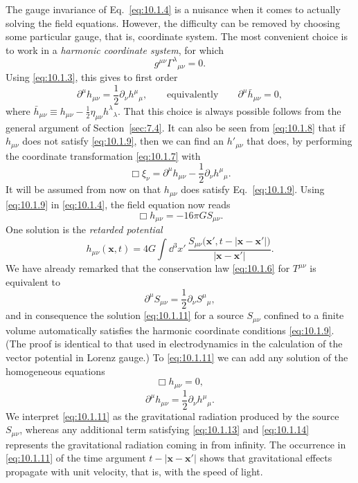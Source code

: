 The gauge invariance of Eq.~\eqref{eq:10.1.4} is a nuisance when it comes to
actually solving the field equations. However, the difficulty can be removed
by choosing some particular gauge, that is, coordinate system. The most
convenient choice is to work in a \emph{harmonic coordinate system}, for which
\[
  g^{\mu\nu}\Gamma^\lambda{}_{\mu\nu}=0.
\]
Using \eqref{eq:10.1.3}, this gives to first order
\begin{equation}
  \partial^\mu h_{\mu\nu}
  =
  \frac12\partial_\nu h^\mu{}_\mu,
  \qquad\text{equivalently}\qquad
  \partial^\mu\bar h_{\mu\nu}=0,
  \tag{10.1.9}\label{eq:10.1.9}
\end{equation}
where
\(\bar h_{\mu\nu}\equiv h_{\mu\nu}
-\frac12\eta_{\mu\nu}h^\lambda{}_\lambda\).
That this choice is always possible follows from the general argument of
Section~\ref{sec:7.4}. It can also be seen from \eqref{eq:10.1.8} that if
\(h_{\mu\nu}\) does not satisfy \eqref{eq:10.1.9}, then we can find an
\(h'_{\mu\nu}\) that does, by performing the coordinate transformation
\eqref{eq:10.1.7} with
\[
  \Box\xi_\nu
  =
  \partial^\mu h_{\mu\nu}
  -\frac12\partial_\nu h^\mu{}_\mu.
\]
It will be assumed from now on that \(h_{\mu\nu}\) does satisfy
Eq.~\eqref{eq:10.1.9}. Using \eqref{eq:10.1.9} in \eqref{eq:10.1.4}, the
field equation now reads
\begin{equation}
  \Box h_{\mu\nu}=-16\pi G S_{\mu\nu}.
  \tag{10.1.10}\label{eq:10.1.10}
\end{equation}
One solution is the \emph{retarded potential}
\begin{equation}
  h_{\mu\nu}(\mathbf{x},t)
  =
  4G\int \dd^3x'\,
  \frac{S_{\mu\nu}\bigl(\mathbf{x}',t-\lvert\mathbf{x}-\mathbf{x}'\rvert\bigr)}
       {\lvert\mathbf{x}-\mathbf{x}'\rvert}.
  \tag{10.1.11}\label{eq:10.1.11}
\end{equation}
We have already remarked that the conservation law
\eqref{eq:10.1.6} for \(T^{\mu\nu}\) is equivalent to
\begin{equation}
  \partial^\mu S_{\mu\nu}
  =
  \frac12\partial_\nu S^\mu{}_\mu,
  \tag{10.1.12}\label{eq:10.1.12}
\end{equation}
and in consequence the solution \eqref{eq:10.1.11} for a source
\(S_{\mu\nu}\) confined to a finite volume automatically satisfies the
harmonic coordinate conditions \eqref{eq:10.1.9}. (The proof is identical
to that used in electrodynamics in the calculation of the vector potential in
Lorenz gauge.) To \eqref{eq:10.1.11} we can add any solution of the
homogeneous equations
\begin{equation}
  \Box h_{\mu\nu}=0,
  \tag{10.1.13}\label{eq:10.1.13}
\end{equation}
\begin{equation}
  \partial^\mu h_{\mu\nu}
  =
  \frac12\partial_\nu h^\mu{}_\mu.
  \tag{10.1.14}\label{eq:10.1.14}
\end{equation}
We interpret \eqref{eq:10.1.11} as the gravitational radiation produced by
the source \(S_{\mu\nu}\), whereas any additional term satisfying
\eqref{eq:10.1.13} and \eqref{eq:10.1.14} represents the gravitational
radiation coming in from infinity. The occurrence in \eqref{eq:10.1.11} of
the time argument \(t-\lvert\mathbf{x}-\mathbf{x}'\rvert\) shows that
gravitational effects propagate with unit velocity, that is, with the speed
of light.
